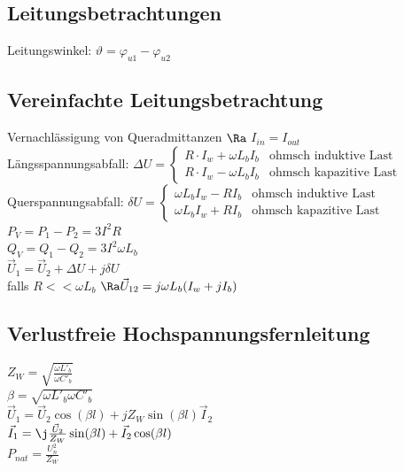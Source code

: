 \documentclass[european]{latex4ei_sheet}
\begin{document}
		\subsection{Leitungsbetrachtungen}

		Leitungswinkel: $\vartheta = \varphi_{u1} - \varphi_{u2}$


		\subsection{Vereinfachte Leitungsbetrachtung}
		
		
		Vernachlässigung von Queradmittanzen $\Ra$ $I_{in} = I_{out}$\\
		Längsspannungsabfall: $\Delta U = \begin{cases} R \cdot I_w + \omega L_b I_b & \text{ohmsch induktive Last} \\ R \cdot I_w - \omega L_b I_b  & \text{ohmsch kapazitive Last} \end{cases} $\\
		Querspannungsabfall: $\delta U = \begin{cases} \omega L_b I_w - R I_b & \text{ohmsch induktive Last} \\ \omega L_b I_w + R I_b & \text{ohmsch kapazitive Last} \end{cases}$\\
		$P_V = P_1 - P_2 = 3 I^2 R$ \\
		$Q_V = Q_1 - Q_2 = 3 I^2 \omega L_b$ \\
		$\vec U_1 = \vec U_2 + \Delta U + j \delta U$ \\
		falls $R << \omega L_b$ \quad $\Ra \vec U_{12} = j \omega L_b (I_w + j I_b)$
		
		\subsection{Verlustfreie Hochspannungsfernleitung}
		
		
		$Z_W = \sqrt{\frac{\omega L'_b}{\omega C'_b}}$ \\
		$\beta = \sqrt{\omega L'_b \omega C'_b}$ \\
		$\vec U_1 = \vec U_2 \cos (\beta l) + j Z_W \sin (\beta l) \vec I_2$ \\
		$\vec I_1 = \j \frac{\vec U_2}{Z_W} \sin (\beta l) + \vec I_2 \cos (\beta l)$ \\
		$P_{nat} = \frac{U_n^2}{Z_W}$ \\
		
\end{document}
